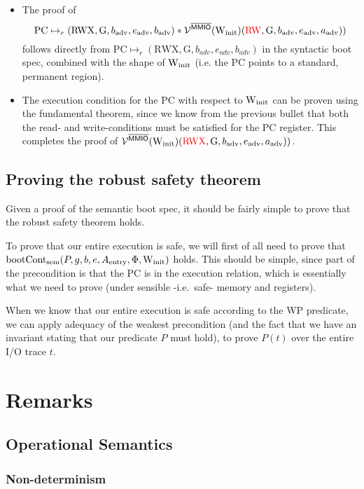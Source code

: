 \documentclass{article}
\newcommand{\X}[1]{\ensuremath{\mathrm{#1}}}
\begin{document}
\begin{itemize}
\item The proof of
  \[\X{PC} \mapsto_{r} (\X{RWX}, \X{G}, b_{\X{adv}}, e_{\X{adv}}, b_{\X{adv}})
        \ast \VR^{\notMMIO} (\Winit)({\color{red}\X{RW}}, \X{G}, b_{\X{adv}}, e_{\X{adv}}, a_{\X{adv}}))
  \]
   follows directly from $ \X{PC} \mapsto_{r} (\X{RWX}, \X{G}, b_{adv}, e_{adv},
   b_{adv}) $ in the syntactic boot spec, combined with the shape of $\Winit$
   (i.e. the PC points to a standard, permanent region).
\item The execution condition for the PC with respect to $\Winit$ can be proven
  using the fundamental theorem, since we know from the previous bullet that
  both the read- and write-conditions must be satisfied for the PC register.
  This completes the proof of $\VR^{\notMMIO} (\Winit)({\color{red}\X{RWX}}, \X{G}, b_{\X{adv}}, e_{\X{adv}}, a_{\X{adv}}))
$.
\end{itemize}

\subsection{Proving the robust safety theorem}
Given a proof of the semantic boot spec, it should be fairly simple to
prove that the robust safety theorem holds.

To prove that our entire execution is safe, we will first of all need to prove
that $\X{bootCont_{sem}}(P, g, b, e, A_{\X{entry}},\Phi,\Winit)$ holds. This
should be simple, since part of the precondition is that the PC is in the
execution relation, which is essentially what we need to prove (under sensible
-i.e.\ safe-
memory and registers).

When we know that our entire execution is safe according to the WP predicate, we
can apply adequacy of the weakest precondition (and the fact that we have an
invariant stating that our predicate $P$ must hold), to prove $P(t)$ over
the entire I/O trace $t$.

\appendix

\section{Remarks}

\subsection{Operational Semantics}

\subsubsection{Non-determinism}
\label{rk:opsem:nondet}
\end{document}
